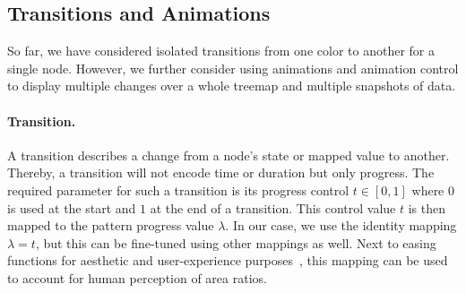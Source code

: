 \documentclass[smallextended,natbib]{svjour3}       %
\begin{document}
\subsection{Transitions and Animations}
So far, we have considered isolated transitions from one color to another for a single node. However, we further consider using animations and animation control to display multiple changes over a whole treemap and multiple snapshots of data.

\paragraph{Transition.}
A transition describes a change from a node's state or mapped value to another.
Thereby, a transition will not encode time or duration but only progress.
The required parameter for such a transition is its progress control $t \in [0, 1]$ where $0$ is used at the start and $1$ at the end of a transition.
This control value $t$ is then mapped to the pattern progress value $\lambda$.
In our case, we use the identity mapping $\lambda = t$, but this can be fine-tuned using other mappings as well.
Next to easing functions for aesthetic and user-experience purposes~\citep{Thomas81}, this mapping can be used to account for human perception of area ratios.
\end{document}
